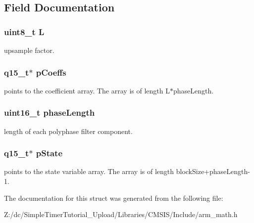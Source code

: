 \subsection{Field Documentation}
\hypertarget{structarm__fir__interpolate__instance__q15_aee73cc056696e504430c53eaa9c58cf0}{
\subsubsection[{L}]{\setlength{\rightskip}{0pt plus 5cm}uint8\-\_\-t L}}\label{structarm__fir__interpolate__instance__q15_aee73cc056696e504430c53eaa9c58cf0}
upsample factor. \hypertarget{structarm__fir__interpolate__instance__q15_a7ca181a37f714d174445f486bebce26f}{
\subsubsection[{p\-Coeffs}]{\setlength{\rightskip}{0pt plus 5cm}q15\-\_\-t$\ast$ p\-Coeffs}}\label{structarm__fir__interpolate__instance__q15_a7ca181a37f714d174445f486bebce26f}
points to the coefficient array. The array is of length L$\ast$phase\-Length. \hypertarget{structarm__fir__interpolate__instance__q15_a8f92bb07e0812f94679438cdf412b26a}{
\subsubsection[{phase\-Length}]{\setlength{\rightskip}{0pt plus 5cm}uint16\-\_\-t phase\-Length}}\label{structarm__fir__interpolate__instance__q15_a8f92bb07e0812f94679438cdf412b26a}
length of each polyphase filter component. \hypertarget{structarm__fir__interpolate__instance__q15_ae29dfdb736374fcddaeaec4b7770170c}{
\subsubsection[{p\-State}]{\setlength{\rightskip}{0pt plus 5cm}q15\-\_\-t$\ast$ p\-State}}\label{structarm__fir__interpolate__instance__q15_ae29dfdb736374fcddaeaec4b7770170c}
points to the state variable array. The array is of length block\-Size+phase\-Length-\/1. 

The documentation for this struct was generated from the following file\-:\begin{DoxyCompactItemize}
\item 
Z\-:/dc/\-Simple\-Timer\-Tutorial\-\_\-\-Upload/\-Libraries/\-C\-M\-S\-I\-S/\-Include/arm\-\_\-math.\-h\end{DoxyCompactItemize}
